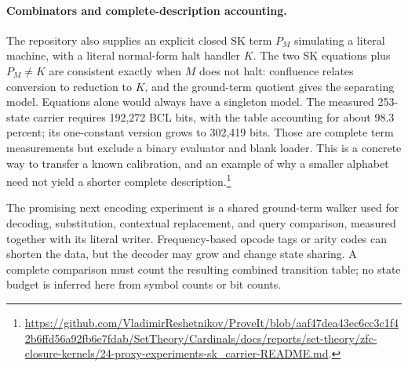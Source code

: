 \paragraph{Combinators and complete-description accounting.}
The repository also supplies an explicit closed SK term $P_M$
simulating a literal machine, with a literal normal-form halt
handler $K$.  The two SK equations plus $P_M\ne K$ are consistent
exactly when $M$ does not halt: confluence relates conversion to
reduction to $K$, and the ground-term quotient gives the separating
model.  Equations alone would always have a singleton model.
The measured 253-state carrier requires 192,272 BCL bits, with
the table accounting for about 98.3 percent; its one-constant version
grows to 302,419 bits.  Those are complete term measurements but
exclude a binary evaluator and blank loader.  This is a concrete
way to transfer a known calibration, and an example of why a smaller
alphabet need not yield a shorter complete description.\footnote{
\url{https://github.com/VladimirReshetnikov/ProveIt/blob/aaf47dea43ec6cc3c1f42b6ffd56a92fb6e7fdab/SetTheory/Cardinals/docs/reports/set-theory/zfc-closure-kernels/24-proxy-experiments-sk_carrier-README.md}.}

The promising next encoding experiment is a shared ground-term
walker used for decoding, substitution, contextual replacement,
and query comparison, measured together with its literal writer.
Frequency-based opcode tags or arity codes can shorten the data,
but the decoder may grow and change state sharing.  A complete
comparison must count the resulting combined transition table;
no state budget is inferred here from symbol counts or bit counts.
